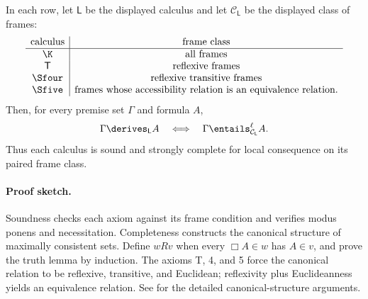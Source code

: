 \begin{theorem}
In each row, let \(\mathsf L\) be the displayed calculus and let
\(\mathcal C_{\mathsf L}\) be the displayed class of frames:
\[
\begin{array}{c|c}
  \text{calculus}&\text{frame class}\\ \hline
  \K&\text{all frames}\\
  \mathsf T&\text{reflexive frames}\\
  \Sfour&\text{reflexive transitive frames}\\
  \Sfive&\text{frames whose accessibility relation is an equivalence relation.}
\end{array}
\]
Then, for every premise set \(\Gamma\) and formula \(A\),
\[
  \Gamma\derives_{\mathsf L}A
  \quad\Longleftrightarrow\quad
  \Gamma\entails^{\ell}_{\mathcal C_{\mathsf L}}A.
\]
Thus each calculus is sound and strongly complete for local consequence on its
paired frame class.
\end{theorem}

\paragraph{Proof sketch.}
Soundness checks each axiom against its frame condition and verifies modus
ponens and necessitation.  Completeness constructs the canonical structure of
maximally consistent sets.  Define \(wRv\) when every \(\Box A\in w\) has
\(A\in v\), and prove the truth lemma by induction.  The axioms T, 4, and 5
force the canonical relation to be reflexive, transitive, and Euclidean;
reflexivity plus Euclideanness yields an equivalence relation.  See
\cite{BlackburnDeRijkeVenema2001} for the detailed canonical-structure
arguments.

